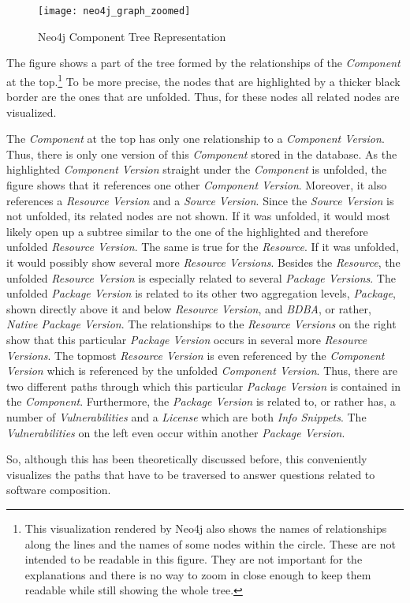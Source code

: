 \begin{figure}[H]
	\centering
	\texttt{[image: neo4j\_graph\_zoomed]}
	\caption[Neo4j Component Tree]{Neo4j Component Tree Representation }
	\label{fig:Neo4jComponentTree}
\end{figure}

The figure shows a part of the tree formed by the relationships of the \emph{Component} at the top.\footnote{This visualization rendered by Neo4j also shows the names of relationships along the lines and the names of some nodes within the circle. These are not intended to be readable in this figure. They are not important for the explanations and there is no way to zoom in close enough to keep them readable while still showing the whole tree.} To be more precise, the nodes that are highlighted by a thicker black border are the ones that are unfolded. Thus, for these nodes all related nodes are visualized.\par
The \emph{Component} at the top has only one relationship to a \emph{Component Version}. Thus, there is only one version of this \emph{Component} stored in the database. As the highlighted \emph{Component Version} straight under the \emph{Component} is unfolded, the figure shows that it references one other \emph{Component Version}. Moreover, it also references a \emph{Resource Version} and a \emph{Source Version}. Since the \emph{Source Version} is not unfolded, its related nodes are not shown. If it was unfolded, it would most likely open up a subtree similar to the one of the highlighted and therefore unfolded \emph{Resource Version}. The same is true for the \emph{Resource}. If it was unfolded, it would possibly show several more \emph{Resource Versions}. Besides the \emph{Resource}, the unfolded \emph{Resource Version} is especially related to several \emph{Package Versions}. The unfolded \emph{Package Version} is related to its other two aggregation levels, \emph{Package}, shown directly above it and below \emph{Resource Version}, and \emph{BDBA}, or rather, \emph{Native Package Version}. The relationships to the \emph{Resource Versions} on the right show that this particular \emph{Package Version} occurs in several more \emph{Resource Versions}. The topmost \emph{Resource Version} is even referenced by the \emph{Component Version} which is referenced by the unfolded \emph{Component Version}. Thus, there are two different paths through which this particular \emph{Package Version} is contained in the \emph{Component}. Furthermore, the \emph{Package Version} is related to, or rather has, a number of \emph{Vulnerabilities} and a \emph{License} which are both \emph{Info Snippets}. The \emph{Vulnerabilities} on the left even occur within another \emph{Package Version}.\par 
So, although this has been theoretically discussed before, this conveniently visualizes the paths that have to be traversed to answer questions related to software composition.


